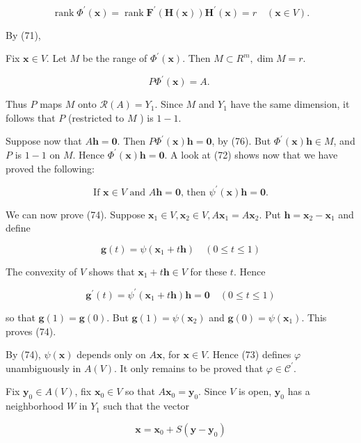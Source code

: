 \documentclass[10pt]{article}
\begin{document}
$$
\operatorname{rank} \Phi^{\prime}(\mathbf{x})=\operatorname{rank} \mathbf{F}^{\prime}(\mathbf{H}(\mathbf{x})) \mathbf{H}^{\prime}(\mathbf{x})=r \quad(\mathbf{x} \in V) .
$$

By (71),

Fix $\mathbf{x} \in V$. Let $M$ be the range of $\Phi^{\prime}(\mathbf{x})$. Then $M \subset R^{m}, \operatorname{dim} M=r$.

$$
P \Phi^{\prime}(\mathbf{x})=A \text {. }
$$

Thus $P$ maps $M$ onto $\mathscr{R}(A)=Y_{1}$. Since $M$ and $Y_{1}$ have the same dimension, it follows that $P$ (restricted to $M$ ) is $1-1$.

Suppose now that $A \mathbf{h}=\mathbf{0}$. Then $P \Phi^{\prime}(\mathbf{x}) \mathbf{h}=\mathbf{0}$, by (76). But $\Phi^{\prime}(\mathbf{x}) \mathbf{h} \in M$, and $P$ is $1-1$ on $M$. Hence $\Phi^{\prime}(\mathbf{x}) \mathbf{h}=\mathbf{0}$. A look at (72) shows now that we have proved the following:

$$
\text { If } \mathbf{x} \in V \text { and } A \mathbf{h}=\mathbf{0} \text {, then } \psi^{\prime}(\mathbf{x}) \mathbf{h}=\mathbf{0} \text {. }
$$

We can now prove (74). Suppose $\mathbf{x}_{1} \in V, \mathbf{x}_{2} \in V, A \mathbf{x}_{1}=A \mathbf{x}_{2}$. Put $\mathbf{h}=\mathbf{x}_{2}-\mathbf{x}_{1}$ and define

$$
\mathbf{g}(t)=\psi\left(\mathbf{x}_{1}+t \mathbf{h}\right) \quad(0 \leq t \leq 1)
$$

The convexity of $V$ shows that $\mathbf{x}_{1}+t \mathbf{h} \in V$ for these $t$. Hence

$$
\mathbf{g}^{\prime}(t)=\psi^{\prime}\left(\mathbf{x}_{1}+t \mathbf{h}\right) \mathbf{h}=\mathbf{0} \quad(0 \leq t \leq 1)
$$

so that $\mathbf{g}(1)=\mathbf{g}(0)$. But $\mathbf{g}(1)=\psi\left(\mathbf{x}_{2}\right)$ and $\mathbf{g}(0)=\psi\left(\mathbf{x}_{1}\right)$. This proves (74).

By (74), $\psi(\mathbf{x})$ depends only on $A \mathbf{x}$, for $\mathbf{x} \in V$. Hence (73) defines $\varphi$ unambiguously in $A(V)$. It only remains to be proved that $\varphi \in \mathscr{C}^{\prime}$.

Fix $\mathbf{y}_{0} \in A(V)$, fix $\mathbf{x}_{0} \in V$ so that $A \mathbf{x}_{0}=\mathbf{y}_{0}$. Since $V$ is open, $\mathbf{y}_{0}$ has a neighborhood $W$ in $Y_{1}$ such that the vector

$$
\mathbf{x}=\mathbf{x}_{0}+S\left(\mathbf{y}-\mathbf{y}_{0}\right)
$$
\end{document}

